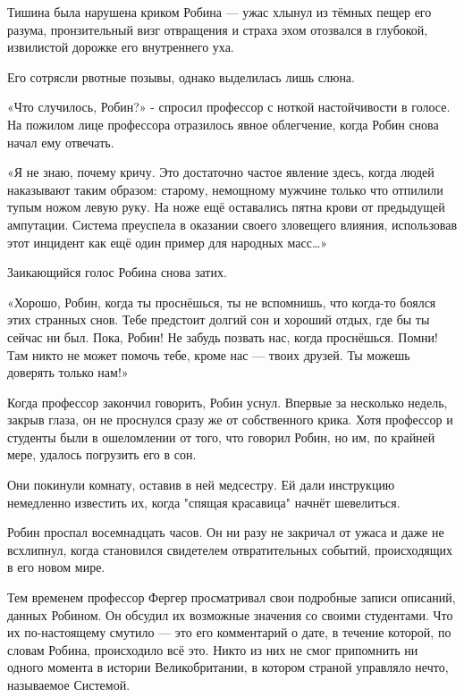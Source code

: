 \documentclass[a4paper,12pt]{book}
\begin{document}
\par
Тишина была нарушена криком Робина — ужас хлынул из тёмных пещер его разума, пронзительный визг отвращения и страха эхом отозвался в глубокой, извилистой дорожке его внутреннего уха.
\par
Его сотрясли рвотные позывы, однако выделилась лишь слюна.
\par
«Что случилось, Робин?» - спросил профессор с ноткой настойчивости в голосе. На пожилом лице профессора отразилось явное облегчение, когда Робин снова начал ему отвечать.
\par
«Я не знаю, почему кричу. Это достаточно частое явление здесь, когда людей наказывают таким образом: старому, немощному мужчине только что отпилили тупым ножом левую руку. На ноже ещё оставались пятна крови от предыдущей ампутации. Система преуспела в оказании своего зловещего влияния, использовав этот инцидент как ещё один пример для народных масс…»
\par
Заикающийся голос Робина снова затих.
\par
«Хорошо, Робин, когда ты проснёшься, ты не вспомнишь, что когда-то боялся этих странных снов. Тебе предстоит долгий сон и хороший отдых, где бы ты сейчас ни был. Пока, Робин! Не забудь позвать нас, когда проснёшься. Помни! Там никто не может помочь тебе, кроме нас — твоих друзей. Ты можешь доверять только нам!»
\par
Когда профессор закончил говорить, Робин уснул. Впервые за несколько недель, закрыв глаза, он не проснулся сразу же от собственного крика. Хотя профессор и студенты были в ошеломлении от того, что говорил Робин, но им, по крайней мере, удалось погрузить его в сон.
\par
Они покинули комнату, оставив в ней медсестру. Ей дали инструкцию немедленно известить их, когда "спящая красавица" начнёт шевелиться.
\par
Робин проспал восемнадцать часов. Он ни разу не закричал от ужаса и даже не всхлипнул, когда становился свидетелем отвратительных событий, происходящих в его новом мире.\\
\par
Тем временем профессор Фергер просматривал свои подробные записи описаний, данных Робином. Он обсудил их возможные значения со своими студентами. Что их по-настоящему смутило — это его комментарий о дате, в течение которой, по словам Робина, происходило всё это. Никто из них не смог припомнить ни одного момента в истории Великобритании, в котором страной управляло нечто, называемое Системой.
\par
\end{document}
